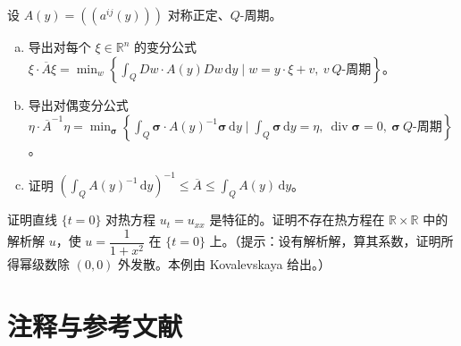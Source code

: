 \documentclass[../../main.tex]{subfiles}
\begin{document}
\begin{exercise}[均匀化中的变分原理]\label{exercise:ch04-18}设 $A(y)=((a^{ij}(y)))$ 对称正定、$Q$-周期。
\begin{enumerate}[(a)]
\item 导出对每个 $\xi\in\mathbb{R}^n$ 的变分公式 $\xi\cdot\overline{A}\xi=\min_w\left\{\int_Q Dw\cdot A(y)Dw\,\mathrm{d}y\mid w=y\cdot\xi+v,\ v\ Q\text{-周期}\right\}$。
\item 导出对偶变分公式 $\eta\cdot\overline{A}^{-1}\eta=\min_{\boldsymbol{\sigma}}\left\{\int_Q\boldsymbol{\sigma}\cdot A(y)^{-1}\boldsymbol{\sigma}\,\mathrm{d}y\mid\int_Q\boldsymbol{\sigma}\,\mathrm{d}y=\eta,\ \operatorname{div}\boldsymbol{\sigma}=0,\ \boldsymbol{\sigma}\ Q\text{-周期}\right\}$。
\item 证明 $\left(\int_Q A(y)^{-1}\,\mathrm{d}y\right)^{-1}\leqslant\overline{A}\leqslant\int_Q A(y)\,\mathrm{d}y$。
\end{enumerate}
\end{exercise}

\begin{exercise}\label{exercise:ch04-19}
证明直线 $\{t=0\}$ 对热方程 $u_t=u_{xx}$ 是特征的。证明不存在热方程在 $\mathbb{R}\times\mathbb{R}$ 中的解析解 $u$，使 $u=\dfrac{1}{1+x^2}$ 在 $\{t=0\}$ 上。（提示：设有解析解，算其系数，证明所得幂级数除 $(0,0)$ 外发散。本例由 Kovalevskaya 给出。）
\end{exercise}

\section{注释与参考文献}\label{section:ch04-references}
\end{document}
